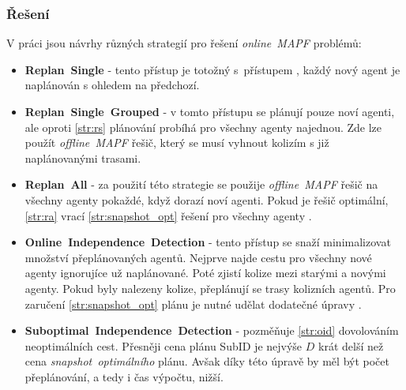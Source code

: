 %

\subsubsection{Řešení~}\label{subsubsec:reseni_online_mapf}





V práci \citet{Svancara} jsou návrhy různých strategií pro řešení \emph{online~MAPF} problémů:
\begin{itemize}
  \item \textbf{Replan~Single} - tento přístup je totožný s~přístupem ,
    každý nový agent je naplánován s ohledem na předchozí.
  \item \textbf{Replan~Single~Grouped}\label{par:replan_single_grouped} -
    v tomto přístupu se plánují pouze noví agenti, ale oproti \ref{str:rs} plánování probíhá pro všechny agenty najednou.
  Zde lze použít \emph{offline~MAPF} řešič, který se musí vyhnout kolizím s již naplánovanými trasami.
  \item \textbf{Replan~All} - za použití této strategie se použije
    \emph{offline~MAPF} řešič na všechny agenty pokaždé, když dorazí noví agenti.
    Pokud je řešič optimální, \ref{str:ra} vrací \ref{str:snapshot_opt} řešení pro všechny agenty \citep{Svancara}.
  \item \textbf{Online~Independence~Detection} - tento přístup se snaží minimalizovat množství přeplánovaných agentů.
  Nejprve najde cestu pro všechny nové agenty ignorujíce už naplánované.
  Poté zjistí kolize mezi starými a novými agenty.
  Pokud byly nalezeny kolize, přeplánují se trasy kolizních agentů.
  Pro zaručení \ref{str:snapshot_opt} plánu je nutné udělat dodatečné úpravy \citep{Svancara}.
  \item \textbf{Suboptimal~Independence~Detection} - pozměňuje \ref{str:oid} dovolováním neoptimálních cest.
  Přesněji cena plánu SubID je nejvýše $D$ krát delší než cena \emph{snapshot~optimálního} plánu.
  Avšak díky této úpravě by měl být počet přeplánování, a tedy i čas výpočtu, nižší.
\end{itemize}



